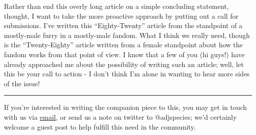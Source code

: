 Rather than end this overly long article on a simple concluding
statement, thought, I want to take the more proactive approach by
putting out a call for submissions. I've written this ``Eighty-Twenty''
article from the standpoint of a mostly-male furry in a mostly-male
fandom. What I think we really need, though is the ``Twenty-Eighty''
article written from a female standpoint about how the fandom works from
that point of view. I know that a few of you (hi guys!) have already
approached me about the possibility of writing such an article; well,
let this be your call to action - I don't think I'm alone in wanting to
hear more sides of the issue!

\begin{center}\rule{0.5\linewidth}{\linethickness}\end{center}

If you're interested in writing the companion piece to this, you may get
in touch with us via \href{mailto:submit@adjectivespecies.com}{email},
or send us a note on twitter to @adjspecies; we'd certainly welcome a
guest post to help fulfill this need in the community.
